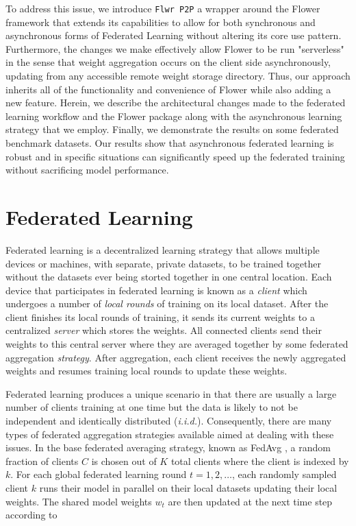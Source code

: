 \documentclass[twocolumn, switch]{article} %
\begin{document}
To address this issue, we introduce \texttt{Flwr P2P} a wrapper around the Flower framework that extends its capabilities to allow for both synchronous and asynchronous forms of Federated Learning without altering its core use pattern. Furthermore, the changes we make effectively allow Flower to be run "serverless" in the sense that weight aggregation occurs on the client side asynchronously, updating from any accessible remote weight storage directory. Thus, our approach inherits all of the functionality and convenience of Flower while also adding a new feature. Herein, we describe the architectural changes made to the federated learning workflow and the Flower package along with the asynchronous learning strategy that we employ. Finally, we demonstrate the results on some federated benchmark datasets. Our results show that asynchronous federated learning is robust and in specific situations can significantly speed up the federated training without sacrificing model performance.  

\section{Federated Learning}

Federated learning is a decentralized learning strategy that allows multiple devices or machines, with separate, private datasets, to be trained together without the datasets ever being storted together in one central location. Each device that participates in federated learning is known as a \textit{client} which undergoes a number of \textit{local rounds} of training on its local dataset. After the client finishes its local rounds of training, it sends its current weights to a centralized \textit{server} which stores the weights. All connected clients send their weights to this central server where they are averaged together by some federated aggregation \textit{strategy}. After aggregation, each client receives the newly aggregated weights and resumes training local rounds to update these weights.

Federated learning produces a unique scenario in that there are usually a large number of clients training at one time but the data is likely to not be independent and identically distributed (\textit{i.i.d.}). Consequently, there are many types of federated aggregation strategies available aimed at dealing with these issues. In the base federated averaging strategy, known as FedAvg \cite{fed_2}, a random fraction of clients $C$ is chosen out of $K$ total clients where the client is indexed by $k$. For each global federated learning round $t=1, 2, \dots$, each randomly sampled client $k$ runs their model in parallel on their local datasets updating their local weights. The shared model weights $w_t$ are then updated at the next time step according to
\end{document}

